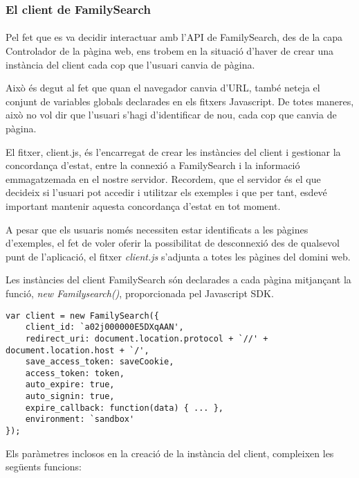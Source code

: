 \subsubsection{El client de FamilySearch}

\paragraph{}
Pel fet que es va decidir interactuar amb l'API de FamilySearch, des de la capa Controlador de la pàgina web, ens trobem en la situació d'haver de crear una instància del client cada cop que l'usuari canvia de pàgina.

Això és degut al fet que quan el navegador canvia d'URL, també neteja el conjunt de variables globals declarades en els fitxers Javascript. De totes maneres, això no vol dir que l'usuari s'hagi d'identificar de nou, cada cop que canvia de pàgina.

El fitxer, client.js, és l'encarregat de crear les instàncies del client i gestionar la concordança d'estat, entre la connexió a FamilySearch i la informació emmagatzemada en el nostre servidor. Recordem, que el servidor és el que decideix si l'usuari pot accedir i utilitzar els exemples i que per tant, esdevé important mantenir aquesta concordança d'estat en tot moment.

A pesar que els usuaris només necessiten estar identificats a les pàgines d'exemples, el fet de voler oferir la possibilitat de desconnexió des de qualsevol punt de l'aplicació, el fitxer \emph{client.js} s'adjunta a totes les pàgines del domini web.

Les instàncies del client FamilySearch són declarades a cada pàgina mitjançant la funció, \emph{new Familysearch()}, proporcionada pel Javascript SDK.

\begin{lstlisting}[style=rawOwn,caption={Creació d'una instància del client FamilySearch}]
var client = new FamilySearch({
    client_id: `a02j000000E5DXqAAN',
    redirect_uri: document.location.protocol + `//' + document.location.host + `/',
    save_access_token: saveCookie,
    access_token: token,
    auto_expire: true,
    auto_signin: true,
    expire_callback: function(data) { ... },
    environment: `sandbox'
});
\end{lstlisting}

Els paràmetres inclosos en la creació de la instància del client, compleixen les següents funcions:

